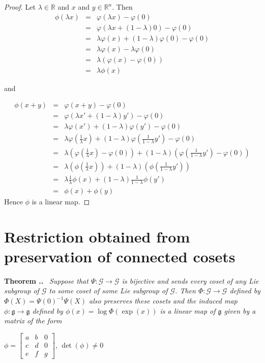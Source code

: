 \documentclass[honours]{UNSWthesis}
\newcommand{\R}{\mathbb{R}}
\newcommand{\G}{\mathcal{G}}
\newcommand{\g}{\mathfrak{g}}
\newcommand{\1}{\mathbf{e}_{1}}
\newcommand{\2}{\mathbf{e}_{3}}
\newcommand{\3}{\mathbf{e}_{3}}
\newcounter{Item}[section]
\newenvironment{Theorem}{\medskip
                            \refstepcounter{Item}
                            \noindent
                           {\bf Theorem \thesection.\theItem.}\ %
                            \begingroup \sl}
                           {\endgroup\medskip}
\begin{document}
\begin{proof}
Let $\lambda \in \R$ and $x$ and $y \in \R^{n}$. Then 
\begin{eqnarray*}
\phi(\lambda x) &=& \varphi(\lambda x) - \varphi(0) \\
&=& \varphi(\lambda x +(1-\lambda)0)-\varphi(0) \\
&=& \lambda \varphi(x)+(1-\lambda)\varphi(0) -\varphi(0) \\
&=& \lambda \varphi(x)-\lambda\varphi(0) \\
&=& \lambda (\varphi(x)-\varphi(0)) \\
&=& \lambda \phi(x) 
\end{eqnarray*}

and

\begin{eqnarray*}
\phi(x+y) &=& \varphi(x+y)-\varphi(0) \\
&=& \varphi(\lambda x' + (1-\lambda)y') -\varphi(0) \\
&=& \lambda \varphi( x') + (1-\lambda)\varphi(y') -\varphi(0) \\
&=& \lambda \varphi(\frac{1}{\lambda} x) + (1-\lambda)\varphi(\frac{1}{1-\lambda} y') -\varphi(0) \\
&=& \lambda (\varphi(\frac{1}{\lambda} x) -\varphi(0)) + (1-\lambda)(\varphi(\frac{1}{1-\lambda} y')-\varphi(0))  \\
&=& \lambda (\phi(\frac{1}{\lambda} x) ) + (1-\lambda)(\phi(\frac{1}{1-\lambda} y'))  \\
&=& \lambda \frac{1}{\lambda} \phi( x)  + (1-\lambda)\frac{1}{1-\lambda} \phi( y')  \\
&=& \phi(x)+\phi(y)
\end{eqnarray*}
Hence $\phi$ is a linear map.
\end{proof} 



\section{Restriction obtained from preservation of connected cosets}

\begin{Theorem}\label{preserve closed cosets}
Suppose that $\Psi: \G \longrightarrow \G$ is bijective and sends every coset of any Lie subgroup of $\G$ to some coset of some Lie subgroup of $\G$. Then $\Phi:\G \longrightarrow \G$ defined by $\Phi(X)=\Psi(0)^{-1}\Psi(X)$ also preserves these cosets and the induced map $\phi: \g \longrightarrow \g$ defined by $\phi(x)=\log \Phi(\exp(x))$ is a linear map of $\g$ given by a matrix of the form

$\phi =\begin{bmatrix}
a & b & 0 \\
c & d & 0 \\
e & f & g
\end{bmatrix}$,
$ \det(\phi) \neq 0 $

\end{Theorem}
\end{document}
